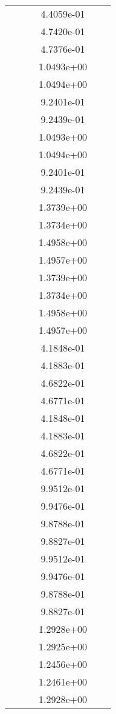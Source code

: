 \begin{xltabular}{\textwidth}{r|rS[table-format=1.3e+2]S[table-format=1.4e+2]S[table-format=1.4e+2]S[table-format=-1.5]}
&  &  & 4.4059e-01 & & \\
&  &  & 4.7420e-01 & & \\
&  &  & 4.7376e-01 & & \\
&  &  & 1.0493e+00 & & \\
&  &  & 1.0494e+00 & & \\
&  &  & 9.2401e-01 & & \\
&  &  & 9.2439e-01 & & \\
&  &  & 1.0493e+00 & & \\
&  &  & 1.0494e+00 & & \\
&  &  & 9.2401e-01 & & \\
&  &  & 9.2439e-01 & & \\
&  &  & 1.3739e+00 & & \\
&  &  & 1.3734e+00 & & \\
&  &  & 1.4958e+00 & & \\
&  &  & 1.4957e+00 & & \\
&  &  & 1.3739e+00 & & \\
&  &  & 1.3734e+00 & & \\
&  &  & 1.4958e+00 & & \\
&  &  & 1.4957e+00 & & \\
&  &  & 4.1848e-01 & & \\
&  &  & 4.1883e-01 & & \\
&  &  & 4.6822e-01 & & \\
&  &  & 4.6771e-01 & & \\
&  &  & 4.1848e-01 & & \\
&  &  & 4.1883e-01 & & \\
&  &  & 4.6822e-01 & & \\
&  &  & 4.6771e-01 & & \\
&  &  & 9.9512e-01 & & \\
&  &  & 9.9476e-01 & & \\
&  &  & 9.8788e-01 & & \\
&  &  & 9.8827e-01 & & \\
&  &  & 9.9512e-01 & & \\
&  &  & 9.9476e-01 & & \\
&  &  & 9.8788e-01 & & \\
&  &  & 9.8827e-01 & & \\
&  &  & 1.2928e+00 & & \\
&  &  & 1.2925e+00 & & \\
&  &  & 1.2456e+00 & & \\
&  &  & 1.2461e+00 & & \\
&  &  & 1.2928e+00 & & \\

\end{xltabular}
